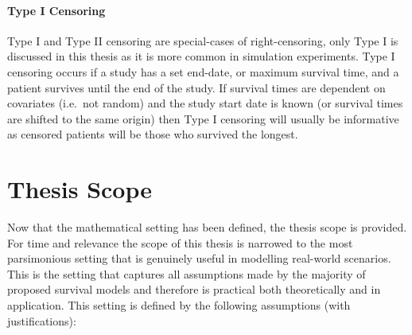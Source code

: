 \documentclass[
  letterpaper,
]{scrbook}
\let\oldparagraph\paragraph
\renewcommand{\paragraph}[1]{\oldparagraph{#1}\mbox{}}
\theoremstyle{plain}
\theoremstyle{definition}
\theoremstyle{remark}
\begin{document}
\paragraph{Type I Censoring}

Type I and Type II censoring are special-cases of right-censoring, only
Type I is discussed in this thesis as it is more common in simulation
experiments. Type I censoring occurs if a study has a set end-date, or
maximum survival time, and a patient survives until the end of the
study. If survival times are dependent on covariates (i.e.~not random)
and the study start date is known (or survival times are shifted to the
same origin) then Type I censoring will usually be informative as
censored patients will be those who survived the longest.

\section{Thesis Scope}
\label{sec:surv_scope}

Now that the mathematical setting has been defined, the thesis scope is
provided. For time and relevance the scope of this thesis is narrowed to
the most parsimonious setting that is genuinely useful in modelling
real-world scenarios. This is the setting that captures all assumptions
made by the majority of proposed survival models and therefore is
practical both theoretically and in application. This setting is defined
by the following assumptions (with justifications):
\end{document}
